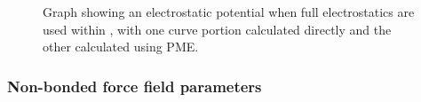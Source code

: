 \begin{figure}[htb]
  \caption[Graph of electrostatic split between short and long range forces]
  {\small Graph showing an electrostatic potential 
  when full electrostatics are used within \NAMD, 
  with one curve portion calculated directly 
  and the other calculated using PME.}
  \label{fig:fmaOn}
\end{figure}



\subsubsection{Non-bonded force field parameters}

